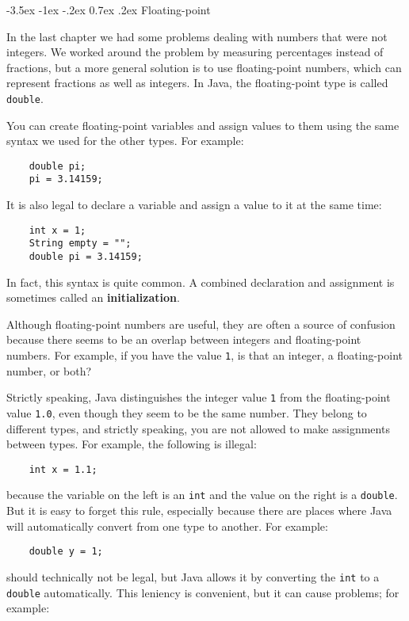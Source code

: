 \documentclass{book}
\makeatletter
\renewcommand{\section}{\@startsection 
    {section} {1} {0mm}%
    {-3.5ex \@plus -1ex \@minus -.2ex}%
    {0.7ex \@plus.2ex}%
    {\normalfont\Large\bfseries}}
\makeatother
\begin{document}
\section{Floating-point}

In the last chapter we had some problems dealing with numbers
that were not integers.  We worked around the problem by measuring
percentages instead of fractions, but a more general solution is
to use floating-point numbers, which can represent fractions
as well as integers.  In Java, the floating-point type is
called {\tt double}.

You can create floating-point variables and assign values to them
using the same syntax we used for the other types.  For example:

\begin{verbatim}
    double pi;
    pi = 3.14159;
\end{verbatim}
%
It is also legal to declare a variable and assign a value to it at the
same time:

\begin{verbatim}
    int x = 1;
    String empty = "";
    double pi = 3.14159;
\end{verbatim}
%
In fact, this syntax is quite common.  A combined declaration
and assignment is sometimes called an {\bf initialization}.


Although floating-point numbers are useful, they are
often a source of confusion because there seems to be an
overlap between integers and floating-point numbers.  For
example, if you have the value {\tt 1}, is that an integer,
a floating-point number, or both?

Strictly speaking, Java distinguishes the integer value {\tt 1}
from the floating-point value {\tt 1.0}, even though they
seem to be the same number.  They belong to
different types, and strictly speaking, you are not allowed
to make assignments between types.  For example, the following
is illegal:

\begin{verbatim}
    int x = 1.1;
\end{verbatim}
%
because the variable on the left is an {\tt int}
and the value on the right is a {\tt double}.  But it is easy
to forget this rule, especially because there are places where Java
will automatically convert from one type to another.
For example:

\begin{verbatim}
    double y = 1;
\end{verbatim}
%
should technically not be legal, but Java allows it by converting the
{\tt int} to a {\tt double} automatically.  This leniency is
convenient, but it can cause problems; for example:
\end{document}
